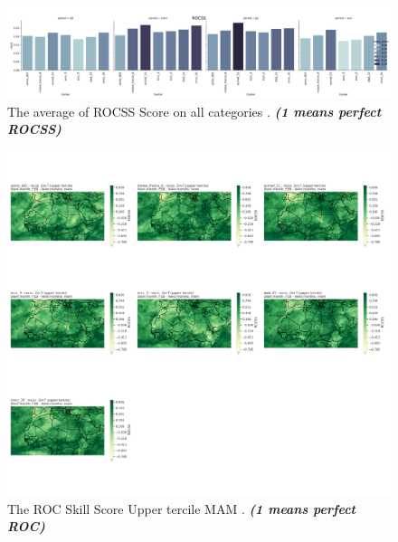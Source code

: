 \begin{figure}[H]
    \centering
    \includegraphics[scale=0.3]{rocss_all.png}
    \caption{The average of  ROCSS Score on all categories    . \textbf{\textit{(1 means perfect ROCSS)}}}
\end{figure}


\begin{figure}[H]
    \centering
    \includegraphics[scale=0.3]{ROCSS_MAM_UPPER.png}
    \caption{The ROC Skill Score Upper tercile MAM    . \textbf{\textit{(1 means perfect ROC)}}}
\end{figure}








